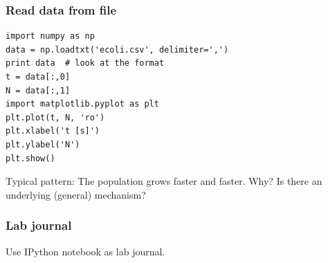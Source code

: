 \documentclass{beamer}
\begin{document}
\begin{frame}
\frametitle{Read data from file}

\begin{block}{}
\begin{verbatim}
import numpy as np
data = np.loadtxt('ecoli.csv', delimiter=',')
print data  # look at the format
t = data[:,0]
N = data[:,1]
import matplotlib.pyplot as plt
plt.plot(t, N, 'ro')
plt.xlabel('t [s]')
plt.ylabel('N')
plt.show()
\end{verbatim}
\end{block}

\begin{block}{Typical pattern: }
The population grows faster and faster. Why? Is there an
underlying (general) mechanism?
\end{block}
\end{frame}

\begin{frame}
\frametitle{Lab journal}

\begin{block}{}
Use IPython notebook as lab journal.
\end{block}
\end{frame}
\end{document}
